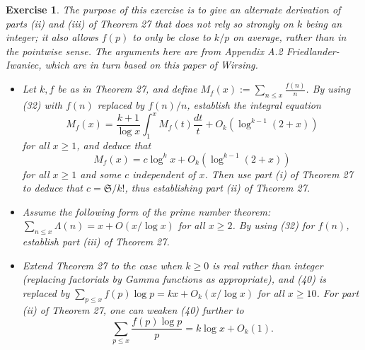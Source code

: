 \documentclass[10pt,reqno]{amsart}
\newtheorem{exercise}[theorem]{Exercise}
\begin{document}
\begin{exercise}
    The purpose of this exercise is to give an alternate derivation of parts (ii) and (iii) of Theorem 27 that does not rely so strongly on $k$ being an integer; it also allows $f(p)$ to only be close to $k/p$ on average, rather than in the pointwise sense. The arguments here are from Appendix A.2 \emph{Friedlander-Iwaniec}, which are in turn based on \emph{this paper of Wirsing}.
    \begin{itemize}
        \item[(i)] Let $k, f$ be as in Theorem 27, and define $M_f(x) := \sum_{n \leq x} \frac{f(n)}{n}$. By using (32) with $f(n)$ replaced by $f(n)/n$, establish the integral equation
        \[  M_f(x) = \frac{k+1}{\log x} \int_1^x M_f(t) \frac{dt}{t} + O_k( \log^{k-1}(2+x) )\]
        for all $x \geq 1$, and deduce that
        \[  M_f(x) = c \log^k x + O_k( \log^{k-1}(2+x) )\]
        for all $x \geq 1$ and some $c$ independent of $x$. Then use part (i) of Theorem 27 to deduce that $c = {\mathfrak S}/k!$, thus establishing part (ii) of Theorem 27.

        \item[(ii)] Assume the following form of the prime number theorem: $\sum_{n \leq x} \Lambda(n) = x + O(x/\log x)$ for all $x \geq 2$. By using (32) for $f(n)$, establish part (iii) of Theorem 27.

        \item[(iii)] Extend Theorem 27 to the case when $k \geq 0$ is real rather than integer (replacing factorials by Gamma functions as appropriate), and (40) is replaced by $\sum_{p \leq x} f(p) \log p = k x + O_k(x/\log x)$ for all $x \geq 10$. For part (ii) of Theorem 27, one can weaken (40) further to 
        \[ \sum_{p \leq x} \frac{f(p) \log p}{p} = k \log x + O_k(1). \]
    \end{itemize}
\end{exercise}
\end{document}
